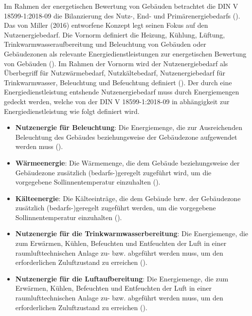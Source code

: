 Im Rahmen der energetischen Bewertung von Gebäuden betrachtet die DIN V 18599-1:2018-09 die Bilanzierung des Nutz-, End- und Primärenergiebedarfs (\cite{DIN18599.2018}).
Das von Miller (2016) entworfene Konzept legt seinen Fokus auf den Nutzenergiebedarf.
Die Vornorm definiert die Heizung, Kühlung, Lüftung, Trinkwarmwasseraufbereitung und Beleuchtung von Gebäuden oder Gebäudezonen 
als relevante Energiedienstleistungen zur energetischen Bewertung von Gebäuden (\cite{DIN18599.2018}).
Im Rahmen der Vornorm wird der Nutzenergiebedarf als Überbegriff für Nutzwärmebedarf, Nutzkältebedarf, Nutzenergiebedarf für Trinkwarmwasser, 
Beleuchtung und Befeuchtung definiert (\cite[Kapitel 3.1.3]{DIN18599.2018}).
Der durch eine Energiedienstleistung entshende Nutzenergiebedarf muss durch Energiemengen gedeckt werden, welche von der DIN V 18599-1:2018-09 in 
abhängigkeit zur Energiedienstleistung wie folgt definiert wird.

\begin{itemize}
    \item \textbf{Nutzenergie für Beleuchtung}: Die Energiemenge, die zur Ausreichenden Beleuchtung des Gebäudes beziehungsweise der Gebäudezone 
    aufgewendet werden muss (\cite[Kapitel 5.3.1]{DIN18599.2018}).
    \item \textbf{Wärmeenergie}: Die Wärmemenge, die dem Gebäude beziehungsweise der Gebäudezone zusätzlich (bedarfs-)geregelt zugeführt wird, 
    um die vorgegebene Sollinnentemperatur einzuhalten (\cite[Kapitel 5.3.1]{DIN18599.2018}).
    \item \textbf{Kälteenergie}: Die Kälteeinträge, die dem Gebäude bzw. der Gebäudezone zusätzlich (bedarfs-)geregelt zugeführt werden, um die 
    vorgegebene Sollinnentemperatur einzuhalten (\cite[Kapitel 5.3.1]{DIN18599.2018}).
    \item \textbf{Nutzenergie für die Trinkwarmwasserbereitung}: Die Energiemenge, die zum Erwärmen, Kühlen, Befeuchten und Entfeuchten der 
    Luft in einer raumlufttechnischen Anlage zu- bzw. abgeführt werden muss, um den erforderlichen Zuluftzustand zu erreichen (\cite[Kapitel 5.3.1]{DIN18599.2018}).
    \item \textbf{Nutzenergie für die Luftaufbereitung}: Die Energiemenge, die zum Erwärmen, Kühlen, Befeuchten und Entfeuchten der Luft in 
    einer raumlufttechnischen Anlage zu- bzw. abgeführt werden muss, um den erforderlichen Zuluftzustand zu erreichen (\cite[Kapitel 5.3.1]{DIN18599.2018}).
\end{itemize}


